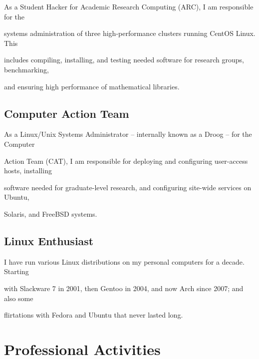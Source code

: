 \documentclass[10pt,letterpaper]{article}
\renewenvironment{itemize}{
  \begin{list}{}{
    \setlength{\leftmargin}{1.5em}
    \setlength{\itemsep}{0em}
    \setlength{\parskip}{0pt}
    \setlength{\parsep}{0em}
  }
}{
  \end{list}
}
\begin{document}
\begin{itemize}

    \item As a Student Hacker for Academic Research Computing (ARC), I am responsible for the
    \item systems administration of three high-performance clusters running CentOS Linux.  This
    \item includes compiling, installing, and testing needed software for research groups, benchmarking,
    \item and ensuring high performance of mathematical libraries.

\end{itemize}

\subsection*{Computer Action Team}

\begin{itemize}

    \item As a Linux/Unix Systems Administrator -- internally known as a Droog -- for the Computer 
    \item Action Team (CAT), I am responsible for deploying and configuring user-access hosts, installing 
    \item software needed for graduate-level research, and configuring site-wide services on Ubuntu,
    \item Solaris, and FreeBSD systems.

\end{itemize}

\subsection*{Linux Enthusiast}

\begin{itemize}

    \item I have run various Linux distributions on my personal computers for a decade.  Starting
    \item with Slackware 7 in 2001, then Gentoo in 2004, and now Arch since 2007; and also some
    \item flirtations with Fedora and Ubuntu that never lasted long.

\end{itemize}

\section*{Professional Activities}
\end{document}
